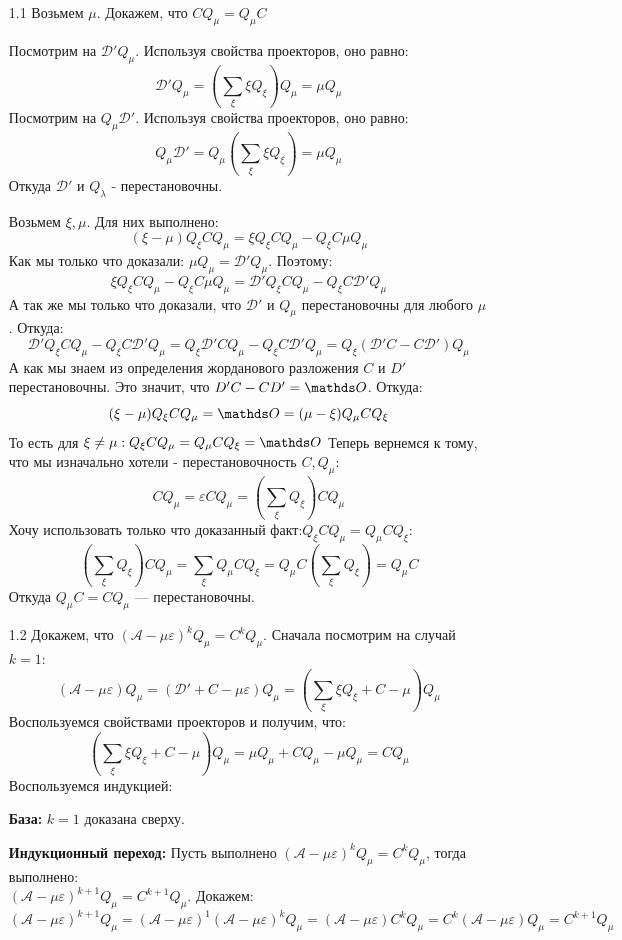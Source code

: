 \begin{enumerate}
    \item[1.1]  Возьмем $ \mu$. Докажем, что $CQ_{\mu}=Q_{\mu}C$
    
    Посмотрим на $\mathcal{D}'Q_{\mu}$. Используя свойства проекторов, оно равно:
    $$\mathcal{D}'Q_{\mu}= \left(\sum\limits_{\xi}\xi Q_\xi\right) Q_{\mu } = \mu Q_{\mu}$$
     Посмотрим на $Q_{\mu}\mathcal{D}'$. Используя свойства проекторов, оно равно:
    $$Q_{\mu}\mathcal{D}'= Q_{\mu }\left(\sum\limits_{\xi}\xi Q_\xi\right)  = \mu Q_{\mu}$$
    Откуда $\mathcal{D}'$ и $Q_{\lambda}$ - перестановочны.

    Возьмем $\xi, \mu$. Для них выполнено:
    $$(\xi-\mu)Q_{\xi} CQ_{\mu} = \xi Q_{\xi}CQ_{\mu}-Q_{\xi}C\mu Q_{\mu}$$
    Как мы только что доказали: $\mu Q_{\mu}=\mathcal{D}'Q_{\mu}$. Поэтому:
    $$\xi Q_{\xi}CQ_{\mu}-Q_{\xi}C\mu Q_{\mu} = \mathcal{D}' Q_{\xi}CQ_{\mu}-Q_{\xi}C\mathcal{D}'Q_{\mu}$$
    А так же мы только что доказали, что $\mathcal{D}'$ и $Q_{\mu}$ перестановочны для любого $\mu$. Откуда:
    $$\mathcal{D}' Q_{\xi}CQ_{\mu}-Q_{\xi}C\mathcal{D}'Q_{\mu} =  Q_{\xi}\mathcal{D}'CQ_{\mu}-Q_{\xi}C\mathcal{D}'Q_{\mu} = Q_{\xi}(\mathcal{D}'C - C\mathcal{D}
    ')Q_{\mu}$$
    А как мы знаем из определения жорданового разложения $C$ и $D'$ перестановочны. Это значит, что $D'C-CD' = \zero$. Откуда:
    $$(\xi-\mu)Q_{\xi} CQ_{\mu} = \zero = (\mu-\xi)Q_{\mu} CQ_{\xi}$$
    То есть для $\xi\neq \mu: Q_{\xi} CQ_{\mu} = Q_{\mu} CQ_{\xi} = \zero$
    Теперь вернемся к тому, что мы изначально хотели - перестановочность $C,Q_{\mu} $:
    $$CQ_{\mu} = \varepsilon C Q_{\mu } = \left(\sum\limits_{\xi}Q_{\xi}\right)CQ_{\mu}$$
    Хочу использовать только что доказанный факт:$Q_{\xi} CQ_{\mu} = Q_{\mu} CQ_{\xi}$:
    $$\left(\sum\limits_{\xi}Q_{\xi}\right)CQ_{\mu}  = \sum\limits_{\xi}Q_{\mu}CQ_{\xi}=Q_{\mu}C \left(\sum\limits_{\xi}Q_{\xi}\right)= Q_{\mu}C$$
    Откуда $Q_{\mu}C = C Q_{\mu}$ --- перестановочны.
    \item[1.2] Докажем, что $(\mathcal{A-\mu\varepsilon})^kQ_{\mu} = C^kQ_{\mu}$.
    Сначала посмотрим на случай $k=1$:
    $$(\mathcal{A-\mu\varepsilon})Q_{\mu} = (\mathcal{D}'+C - \mu \varepsilon)Q_{\mu}=(\sum\limits_{\xi}\xi Q_{\xi} + C  - \mu )Q_{\mu}$$
    Воспользуемся свойствами проекторов и получим, что:
    $$(\sum\limits_{\xi}\xi Q_{\xi} + C  - \mu)Q_{\mu} = \mu Q_{\mu} + C Q_{\mu}- \mu Q_{\mu}= CQ_{\mu}$$
    Воспользуемся индукцией:

    \textbf{База:} $k=1$ доказана сверху.

    \textbf{Индукционный переход:} Пусть выполнено $(\mathcal{A-\mu\varepsilon})^kQ_{\mu} = C^kQ_{\mu}$,  тогда выполнено:\\
    $(\mathcal{A-\mu\varepsilon})^{k+1}Q_{\mu} = C^{k+1}Q_{\mu}$. Докажем:
    $$(\mathcal{A-\mu\varepsilon})^{k+1}Q_{\mu}  = (\mathcal{A-\mu\varepsilon})^{1}(\mathcal{A-\mu\varepsilon})^{k}Q_{\mu} = (\mathcal{A-\mu\varepsilon}) C^kQ_{\mu} = C^k(\mathcal{A-\mu\varepsilon})Q_{\mu} = C^{k+1}Q_{\mu}$$
    

\end{enumerate}
